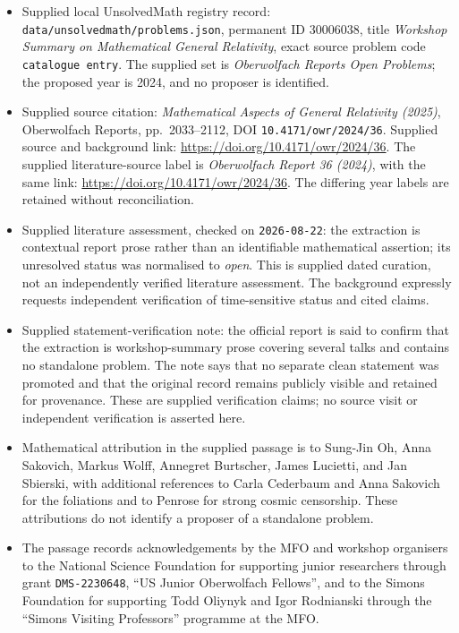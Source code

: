 \documentclass[11pt]{article}
\begin{document}
\begin{itemize}
\item Supplied local UnsolvedMath registry record: \texttt{data/unsolvedmath/problems.json}, permanent ID \(30006038\), title \emph{Workshop Summary on Mathematical General Relativity}, exact source problem code \texttt{catalogue entry}. The supplied set is \emph{Oberwolfach Reports Open Problems}; the proposed year is 2024, and no proposer is identified.
\item Supplied source citation: \emph{Mathematical Aspects of General Relativity (2025)}, Oberwolfach Reports, pp.\ 2033--2112, DOI \texttt{10.4171/owr/2024/36}. Supplied source and background link: \url{https://doi.org/10.4171/owr/2024/36}. The supplied literature-source label is \emph{Oberwolfach Report 36 (2024)}, with the same link: \url{https://doi.org/10.4171/owr/2024/36}. The differing year labels are retained without reconciliation.
\item Supplied literature assessment, checked on \texttt{2026-08-22}: the extraction is contextual report prose rather than an identifiable mathematical assertion; its unresolved status was normalised to \emph{open}. This is supplied dated curation, not an independently verified literature assessment. The background expressly requests independent verification of time-sensitive status and cited claims.
\item Supplied statement-verification note: the official report is said to confirm that the extraction is workshop-summary prose covering several talks and contains no standalone problem. The note says that no separate clean statement was promoted and that the original record remains publicly visible and retained for provenance. These are supplied verification claims; no source visit or independent verification is asserted here.
\item Mathematical attribution in the supplied passage is to Sung-Jin Oh, Anna Sakovich, Markus Wolff, Annegret Burtscher, James Lucietti, and Jan Sbierski, with additional references to Carla Cederbaum and Anna Sakovich for the foliations and to Penrose for strong cosmic censorship. These attributions do not identify a proposer of a standalone problem.
\item The passage records acknowledgements by the MFO and workshop organisers to the National Science Foundation for supporting junior researchers through grant \texttt{DMS-2230648}, ``US Junior Oberwolfach Fellows'', and to the Simons Foundation for supporting Todd Oliynyk and Igor Rodnianski through the ``Simons Visiting Professors'' programme at the MFO.
\end{itemize}
\end{document}
